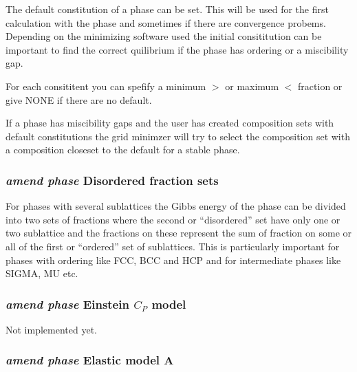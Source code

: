 \documentclass[12pt]{article}
\begin{document}
The default constitution of a phase can be set.  This will be used for
the first calculation with the phase and sometimes if there are
convergence probems.  Depending on the minimizing software used the
initial consititution can be important to find the correct quilibrium
if the phase has ordering or a miscibility gap.

For each consititent you can spefify a minimum $>$ or maximum $<$
fraction or give NONE if there are no default.

If a phase has miscibility gaps and the user has created composition
sets with default constitutions the grid minimzer will try to select
the composition set with a composition closeset to the default for a
stable phase.

\subsubsection{{\em amend phase} Disordered fraction sets}

For phases with several sublattices the Gibbs energy of the phase can
be divided into two sets of fractions where the second or
``disordered'' set have only one or two sublattice and the fractions
on these represent the sum of fraction on some or all of the first or
``ordered'' set of sublattices.  This is particularly important for
phases with ordering like FCC, BCC and HCP and for intermediate phases
like SIGMA, MU etc.

\subsubsection{{\em amend phase} Einstein $C_P$ model}

Not implemented yet.

\subsubsection{{\em amend phase} Elastic model A}
\end{document}
